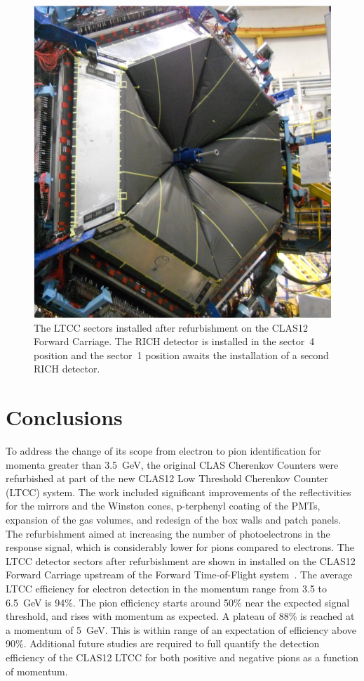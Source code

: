 \begin{figure}[!ht]
    \centering
    \includegraphics[width=1.0\columnwidth, height=1.1\columnwidth]{img/ltccInstalled.png}
    \caption{The LTCC sectors installed after refurbishment on the CLAS12 Forward Carriage. The RICH detector
    is installed in the sector~4 position and the sector~1 position awaits the installation of a second RICH detector.}
    \label{fig:ltccInstalled}
\end{figure}

\section{Conclusions}

To address the change of its scope from electron to pion identification for momenta greater than 3.5~GeV,
the original CLAS Cherenkov Counters were refurbished at part of the new CLAS12 Low Threshold Cherenkov
Counter (LTCC) system. The work included significant improvements of the reflectivities for the mirrors and
the Winston cones, p-terphenyl coating of the PMTs, expansion of the gas volumes, and redesign of the box walls
and patch panels. The refurbishment aimed at increasing the number of photoelectrons in the response signal,
which is considerably lower for pions compared to electrons. The LTCC detector sectors after refurbishment are
shown in  installed on the CLAS12 Forward Carriage upstream of the Forward Time-of-Flight
system~\cite{ftof-nim}. The average LTCC efficiency for electron detection in the momentum range from 3.5 to
6.5~GeV is 94\%. The pion efficiency starts around 50\% near the expected signal threshold, and rises with
momentum as expected. A plateau of 88\% is reached at a momentum of 5~GeV. This is within range of an
expectation of efficiency above 90\%. Additional future studies are required to full quantify the detection
efficiency of the CLAS12 LTCC for both positive and negative pions as a function of momentum.

